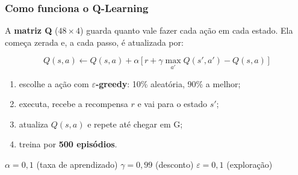 \documentclass{beamer}
\begin{document}
\begin{frame}

\frametitle{Como funciona o Q-Learning}



A \textbf{matriz Q} ($48 \times 4$) guarda quanto vale fazer cada ação em cada estado.
Ela começa zerada e, a cada passo, é atualizada por:



\vspace{0.2cm}



\[
Q(s,a) \leftarrow Q(s,a) + \alpha\,\big[\, r + \gamma \max_{a'} Q(s',a') - Q(s,a) \,\big]
\]



\vspace{0.2cm}



\begin{enumerate}

\item escolhe a ação com \textbf{$\varepsilon$-greedy}: 10\% aleatória, 90\% a melhor;

\vspace{0.1cm}

\item executa, recebe a recompensa $r$ e vai para o estado $s'$;

\vspace{0.1cm}

\item atualiza $Q(s,a)$ e repete até chegar em G;

\vspace{0.1cm}

\item treina por \textbf{500 episódios}.

\end{enumerate}



\vspace{0.2cm}



{\small $\alpha = 0{,}1$ (taxa de aprendizado) \quad
$\gamma = 0{,}99$ (desconto) \quad $\varepsilon = 0{,}1$ (exploração)}



\end{frame}





\end{document}
